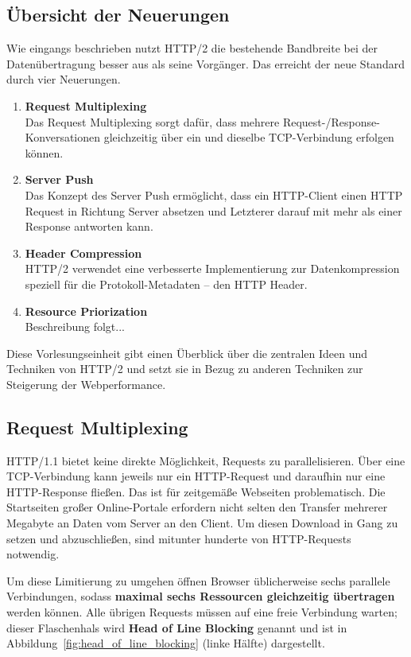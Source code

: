 \documentclass[a4paper, justified, notoc]{tufte-handout} %
\begin{document}
\subsection{Übersicht der Neuerungen} %
\label{sub:neuerungen}
Wie eingangs beschrieben nutzt HTTP/2 die bestehende Bandbreite bei der Datenübertragung besser aus als seine Vorgänger. Das erreicht der neue Standard durch vier Neuerungen. 
\begin{enumerate}
	\item \textbf{Request Multiplexing} \\ Das Request Multiplexing sorgt dafür, dass mehrere Request-/Response-Konversationen gleichzeitig über ein und dieselbe TCP-Verbindung erfolgen können.
	\item \textbf{Server Push} \\ Das Konzept des Server Push ermöglicht, dass ein HTTP-Client einen HTTP Request in Richtung Server absetzen und Letzterer darauf mit mehr als einer Response antworten kann.
	\item \textbf{Header Compression} \\ HTTP/2 verwendet eine verbesserte Implementierung zur Datenkompression speziell für die Protokoll-Metadaten -- den HTTP Header.
	\item \textbf{Resource Priorization} \\ Beschreibung folgt...
\end{enumerate}


Diese Vorlesungseinheit gibt einen Überblick über die zentralen Ideen und Techniken von HTTP/2 und setzt sie in Bezug zu anderen Techniken zur Steigerung der Webperformance.

\subsection{Request Multiplexing} %
\label{sub:reduktion_der_ladezeiten}
HTTP/1.1 bietet keine direkte Möglichkeit, Requests zu parallelisieren. Über eine TCP-Verbindung kann jeweils nur ein HTTP-Request und daraufhin nur eine HTTP-Response fließen. Das ist für zeitgemäße Webseiten problematisch. Die Startseiten großer Online-Portale erfordern nicht selten den Transfer mehrerer Megabyte an Daten vom Server an den Client. Um diesen Download in Gang zu setzen und abzuschließen, sind mitunter hunderte von HTTP-Requests notwendig.

Um diese Limitierung zu umgehen öffnen Browser üblicherweise sechs parallele Verbindungen, sodass \textbf{maximal sechs Ressourcen gleichzeitig übertragen} werden können. Alle übrigen Requests müssen auf eine freie Verbindung warten; dieser Flaschenhals wird \textbf{Head of Line Blocking} genannt und ist in Abbildung~\ref{fig:head_of_line_blocking} (linke Hälfte) dargestellt.
\end{document}
